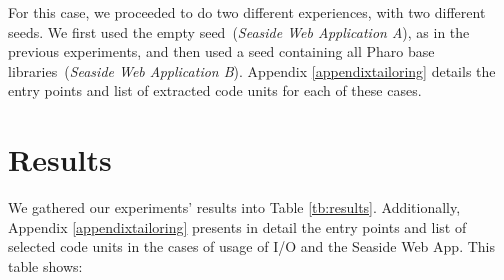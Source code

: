 For this case, we proceeded to do two different experiences, with two different seeds. We first used the empty seed~(\emph{Seaside Web Application A}), as in the previous experiments, and then used a seed containing all Pharo base libraries~(\emph{Seaside Web Application B}). Appendix \ref{appendixtailoring} details the entry points and list of extracted code units for each of these cases.

\section{Results} \label{sec:results_discussion}

We gathered our experiments' results into Table \ref{tb:results}. Additionally, Appendix \ref{appendixtailoring} presents in detail the entry points and list of selected code units in the cases of usage of I/O and the Seaside Web App. This table shows:
